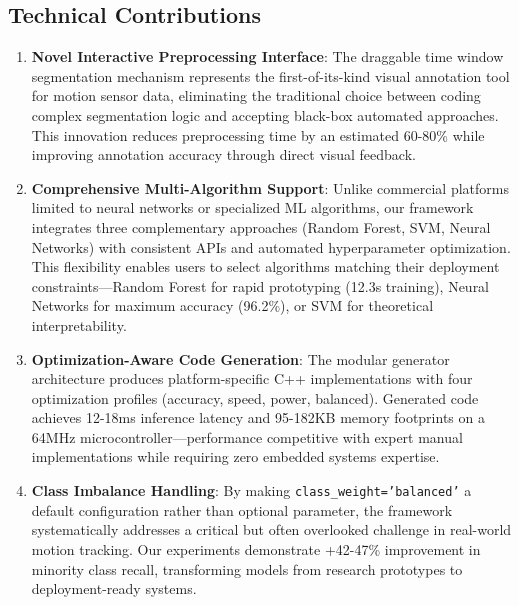 \subsection{Technical Contributions}
\begin{enumerate}
    \item \textbf{Novel Interactive Preprocessing Interface}: The draggable time window segmentation mechanism represents the first-of-its-kind visual annotation tool for motion sensor data, eliminating the traditional choice between coding complex segmentation logic and accepting black-box automated approaches. This innovation reduces preprocessing time by an estimated 60-80\% while improving annotation accuracy through direct visual feedback.

    \item \textbf{Comprehensive Multi-Algorithm Support}: Unlike commercial platforms limited to neural networks or specialized ML algorithms, our framework integrates three complementary approaches (Random Forest, SVM, Neural Networks) with consistent APIs and automated hyperparameter optimization. This flexibility enables users to select algorithms matching their deployment constraints—Random Forest for rapid prototyping (12.3s training), Neural Networks for maximum accuracy (96.2\%), or SVM for theoretical interpretability.

    \item \textbf{Optimization-Aware Code Generation}: The modular generator architecture produces platform-specific C++ implementations with four optimization profiles (accuracy, speed, power, balanced). Generated code achieves 12-18ms inference latency and 95-182KB memory footprints on a 64MHz microcontroller—performance competitive with expert manual implementations while requiring zero embedded systems expertise.

    \item \textbf{Class Imbalance Handling}: By making \texttt{class\_weight='balanced'} a default configuration rather than optional parameter, the framework systematically addresses a critical but often overlooked challenge in real-world motion tracking. Our experiments demonstrate +42-47\% improvement in minority class recall, transforming models from research prototypes to deployment-ready systems.
\end{enumerate}

